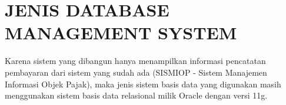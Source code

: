 \chapter{JENIS DATABASE MANAGEMENT SYSTEM}

Karena sistem yang dibangun hanya menampilkan informasi pencatatan pembayaran dari sistem yang sudah ada (SISMIOP - Sistem Manajemen Informasi Objek Pajak), maka jenis sistem basis data yang digunakan masih menggunakan sistem basis data relasional milik Oracle dengan versi 11g.

